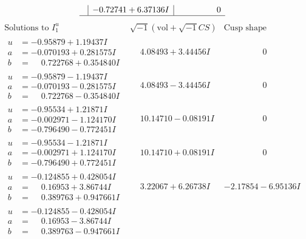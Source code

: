 \documentclass[1p]{elsarticle_modified}
\theoremstyle{definition}
\newcommand{\I}{\sqrt{-1}}
\begin{document}
$$\begin{array}{c|c|c}
 & -0.72741 + 6.37136 I & \phantom{-0.000000 } 0\\
 \hline 
 \end{array}$$\newpage$$\begin{array}{c|c|c}  
\text{Solutions to }I^u_{1}& \I (\text{vol} + \sqrt{-1}CS) & \text{Cusp shape}\\
 \hline 
\begin{aligned}
u &= -0.95879 + 1.19437 I \\
a &= -0.070193 + 0.281575 I \\
b &= \phantom{-}0.722768 + 0.354840 I\end{aligned}
 & \phantom{-}4.08493 + 3.44456 I & \phantom{-0.000000 } 0 \\ \hline\begin{aligned}
u &= -0.95879 - 1.19437 I \\
a &= -0.070193 - 0.281575 I \\
b &= \phantom{-}0.722768 - 0.354840 I\end{aligned}
 & \phantom{-}4.08493 - 3.44456 I & \phantom{-0.000000 } 0 \\ \hline\begin{aligned}
u &= -0.95534 + 1.21871 I \\
a &= -0.002971 - 1.124170 I \\
b &= -0.796490 - 0.772451 I\end{aligned}
 & \phantom{-}10.14710 - 0.08191 I & \phantom{-0.000000 } 0 \\ \hline\begin{aligned}
u &= -0.95534 - 1.21871 I \\
a &= -0.002971 + 1.124170 I \\
b &= -0.796490 + 0.772451 I\end{aligned}
 & \phantom{-}10.14710 + 0.08191 I & \phantom{-0.000000 } 0 \\ \hline\begin{aligned}
u &= -0.124855 + 0.428054 I \\
a &= \phantom{-}0.16953 + 3.86744 I \\
b &= \phantom{-}0.389763 + 0.947661 I\end{aligned}
 & \phantom{-}3.22067 + 6.26738 I & -2.17854 - 6.95136 I \\ \hline\begin{aligned}
u &= -0.124855 - 0.428054 I \\
a &= \phantom{-}0.16953 - 3.86744 I \\
b &= \phantom{-}0.389763 - 0.947661 I\end{aligned}

\end{array}$$
\end{document}
